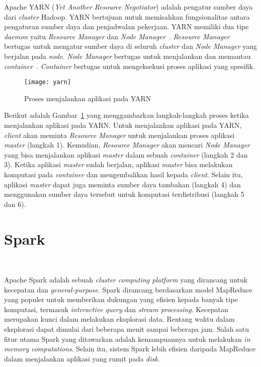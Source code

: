 Apache YARN (\textit{Yet Another Resource Negotiator}) adalah pengatur sumber daya dari \textit{cluster} Hadoop. YARN bertujuan untuk memisahkan fungsionalitas antara pengaturan sumber daya dan penjadwalan pekerjaan. YARN memiliki dua tipe \textit{daemon} yaitu \textit{Resource Manager} dan \textit{Node Manager}~\cite{tomwhite:05:htdg}.  \textit{Resource Manager} bertugas untuk mengatur sumber daya di seluruh \textit{cluster} dan \textit{Node Manager} yang berjalan pada \textit{node}. \textit{Node Manager} bertugas untuk menjalankan dan memantau \textit{container}~\cite{tomwhite:05:htdg}. \textit{Container} bertugas untuk mengeksekusi proses aplikasi yang spesifik.

\begin{figure}[H]
    \centering  
    \texttt{[image: yarn]}  
    \caption[Proses menjalankan aplikasi pada YARN]{Proses menjalankan aplikasi pada YARN} 
    \label{fig:yarn} 
\end{figure}

Berikut adalah Gambar~\ref{fig:yarn} yang menggambarkan langkah-langkah proses ketika menjalankan aplikasi pada YARN. Untuk menjalankan aplikasi pada YARN, \textit{client} akan meminta \textit{Resource Manager} untuk menjalankan proses aplikasi \textit{master} (langkah 1). Kemudian, \textit{Resource Manager} akan mencari \textit{Node Manager} yang bisa menjalankan aplikasi \textit{master} dalam sebuah \textit{container} (langkah 2 dan 3). Ketika aplikasi \textit{master} sudah berjalan, aplikasi \textit{master} bisa melakukan komputasi pada \textit{container} dan mengembalikan hasil kepada \textit{client}. Selain itu, aplikasi \textit{master} dapat juga meminta sumber daya tambahan (langkah 4) dan menggunakan sumber daya tersebut untuk komputasi terdistribusi (langkah 5 dan 6).\\

\section{Spark}~\cite{holdenkarau:07:ls}

Apache Spark adalah sebuah \textit{cluster computing platform} yang dirancang untuk kecepatan dan \textit{general-purpose}. Spark dirancang berdasarkan model MapReduce yang populer untuk memberikan dukungan yang efisien kepada banyak tipe komputasi, termasuk \textit{interactive query} dan \textit{stream processing}. Kecepatan merupakan kunci dalam melakukan eksplorasi data. Rentang waktu dalam eksplorasi dapat dimulai dari beberapa menit sampai beberapa jam. Salah satu fitur utama Spark yang ditawarkan adalah kemampuannya untuk melakukan \textit{in memory computations}. Selain itu, sistem Spark lebih efisien daripada MapReduce dalam menjalankan aplikasi yang rumit pada \textit{disk}.\\


